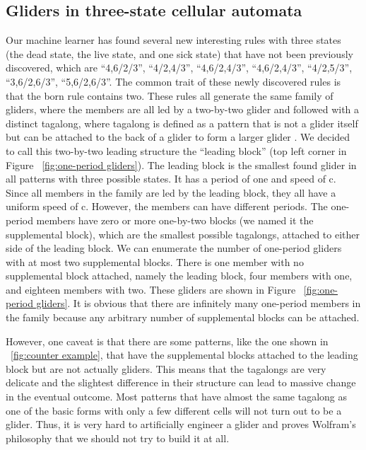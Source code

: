 \documentclass[12pt]{article}
\numberwithin{figure}{section} %
\begin{document}
\subsection{Gliders in three-state cellular automata}
Our machine learner has found several new interesting rules with three states (the dead state, the live state, and one sick state) that have not been previously discovered, which are “4,6/2/3”, “4/2,4/3”, “4,6/2,4/3”, “4,6/2,4/3”, “4/2,5/3”, “3,6/2,6/3”, “5,6/2,6/3”. The common trait of these newly discovered rules is that the born rule contains two. These rules all generate the same family of gliders, where the members are all led by a two-by-two glider and followed with a distinct tagalong, where tagalong is defined as a pattern that is not a glider itself but can be attached to the back of a glider to form a larger glider \cite{spaceship}. We decided to call this two-by-two leading structure the “leading block” (top left corner in Figure ~\ref{fig:one-period gliders}). The leading block is the smallest found glider in all patterns with three possible states. It has a period of one and speed of c. Since all members in the family are led by the leading block, they all have a uniform speed of c. However, the members can have different periods. The one-period members have zero or more one-by-two blocks (we named it the supplemental block), which are the smallest possible tagalongs, attached to either side of the leading block. We can enumerate the number of one-period gliders with at most two supplemental blocks. There is one member with no supplemental block attached, namely the leading block, four members with one, and eighteen members with two. These gliders are shown in Figure ~\ref{fig:one-period gliders}. It is obvious that there are infinitely many one-period members in the family because any arbitrary number of supplemental blocks can be attached. 

However, one caveat is that there are some patterns, like the one shown in ~\ref{fig:counter example}, that have the supplemental blocks attached to the leading block but are not actually gliders. This means that the tagalongs are very delicate and the slightest difference in their structure can lead to massive change in the eventual outcome. Most patterns that have almost the same tagalong as one of the basic forms with only a few different cells will not turn out to be a glider. Thus, it is very hard to artificially engineer a glider and proves Wolfram's philosophy that we should not try to build it at all. 
\end{document}
